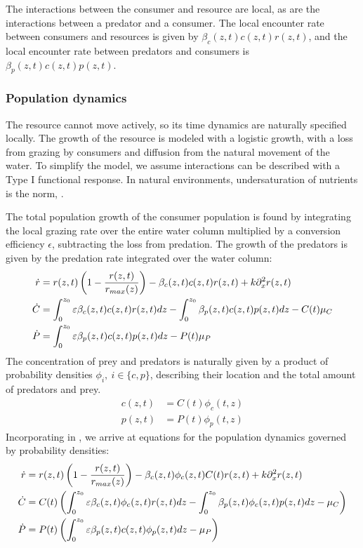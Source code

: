 The interactions between the consumer and resource are local, as are the interactions between a predator and a consumer. The local encounter rate between consumers and resources is given by $\beta_c(z,t)c(z,t)r(z,t)$, and the local encounter rate between predators and consumers is $\beta_p(z,t)c(z,t)p(z,t)$.

\subsubsection*{Population dynamics}
The resource cannot move actively, so its time dynamics are naturally specified locally. The growth of the resource is modeled with a logistic growth, with a loss from grazing by consumers and diffusion from the natural movement of the water.
To simplify the model, we assume interactions can be described with a Type I functional response. In natural environments, undersaturation of nutrients is the norm, \citep{}.


The total population growth of the consumer population is found by integrating the local grazing rate over the entire water column multiplied by a conversion efficiency $\epsilon$, subtracting the loss from predation. The growth of the predators is given by the predation rate integrated over the water column:
\begin{align}
  \label{eq:population_growth}
  \dot{r} &= r(z,t)\left ( 1-\frac{r(z,t)}{r_{max}(z)} \right ) - \beta_c(z,t)c(z,t) r(z,t) + k \partial_x^2 r(z,t) \\
  \dot{C} &=  \int_0^{z_0} \varepsilon \beta_c(z,t)c(z,t)r(z,t) dz- \int_0^{z_0} \beta_p(z,t) c(z,t) p(z,t) dz - C(t)\mu_C  \\
  \dot{P} &=  \int_0^{z_0} \varepsilon \beta_p(z,t) c(z,t)p(z,t) dz - P(t)\mu_P
\end{align}
The concentration of prey and predators is naturally given by a product of probability densities $\phi_i,~i\in \{c,p\}$, describing their location and the total amount of predators and prey.
\begin{align}
  \label{eq:prob_dens}
	c(z,t) &= C(t)\phi_c(t, z) \\
	p(z,t) &= P(t)\phi_p(t, z)
\end{align}
Incorporating  in , we arrive at equations for the population dynamics governed by probability densities:
\begin{align}
  \label{eq:population_growth_prob_dens}
	\dot{r} &= r(z,t)\pa{1-\frac{r(z,t)}{r_{max}(z)}} - \beta_c(z,t)\phi_c(z,t)C(t) r(z,t)  + k \partial_x^2 r(z,t)\\
	\dot{C} &= C(t)\left ( \int_0^{z_0} \varepsilon \beta_c(z,t)\phi_c(z,t)r(z,t) dz- \int_0^{z_0} \beta_p(z,t) \phi_c(z,t) p(z,t) dz - \mu_C \right ) \\
	\dot{P} &= P(t) \left ( \int_0^{z_0} \varepsilon \beta_p(z,t) c(z,t)\phi_p(z,t) dz - \mu_P \right )
\end{align}


